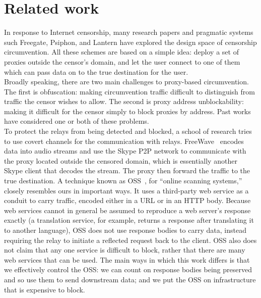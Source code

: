 \documentclass{article}
\begin{document}

\section{Related work}

In response to Internet censorship, many research papers and pragmatic systems
such Freegate, Psiphon, and Lantern have explored the design space of censorship
circumvention. All these schemes are based on a simple idea: deploy a set of
proxies outside the censor's domain, and let the user connect to one of them
which can pass data on to the true destination for the user.\\

Broadly speaking, there are two main challenges to proxy-based circumvention.
The first is obfuscation: making circumvention traffic difficult to distinguish
from traffic the censor wishes to allow. The second is proxy address
unblockability: making it difficult for the censor simply to block proxies by
address. Past works have considered one or both of these problems.\\

To protect the relays from being detected and blocked, a school of research
tries to use covert channels for the communication with relays. FreeWave~\cite{freewave}
encodes data into audio streams and use the Skype P2P network to communicate
with the proxy located outside the censored domain, which is essentially another
Skype client that decodes the stream. The proxy then forward the traffic to the
true destination. A technique known as OSS~\cite{oss}, for ``online scanning
systems,'' closely resembles ours in important ways. It uses a third-party web
service as a conduit to carry traffic, encoded either in a URL or in an HTTP
body. Because web services cannot in general be assumed to reproduce a web
server's response exactly (a translation service, for example, returns a
response after translating it to another language), OSS does not use response
bodies to carry data, instead requiring the relay to initiate a reflected
request back to the client. OSS also does not claim that any one service is
difficult to block, rather that there are many web services that can be used.
The main ways in which this work differs is that we effectively control the OSS:
we can count on response bodies being preserved and so use them to send
downstream data; and we put the OSS on infrastructure that is expensive to
block.\\
\end{document}
